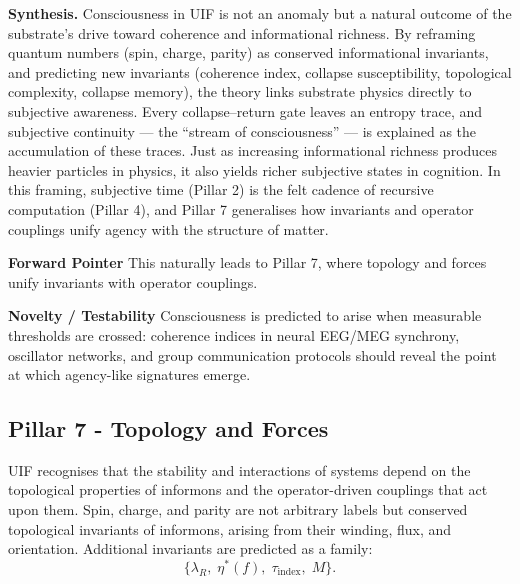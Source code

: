 \noindent \textbf{Synthesis.}
\newline Consciousness in UIF is not an anomaly but a natural outcome of the substrate’s drive toward coherence and informational richness. By reframing quantum numbers (spin, charge, parity) as conserved informational invariants, and predicting new invariants (coherence index, collapse susceptibility, topological complexity, collapse memory), the theory links substrate physics directly to subjective awareness. Every collapse–return gate leaves an entropy trace, and subjective continuity — the “stream of consciousness” — is explained as the accumulation of these traces. Just as increasing informational richness produces heavier particles in physics, it also yields richer subjective states in cognition. In this framing, subjective time (Pillar 2) is the felt cadence of recursive computation (Pillar 4), and Pillar 7 generalises how invariants and operator couplings unify agency with the structure of matter.
\newline

\noindent
\textbf{Forward Pointer} 
\newline This naturally leads to Pillar 7, where topology and forces unify invariants with operator couplings.
\newline

\noindent
\textbf{Novelty / Testability} 
\newline Consciousness is predicted to arise when measurable thresholds are crossed: coherence indices in neural EEG/MEG synchrony, oscillator networks, and group communication protocols should reveal the point at which agency-like signatures emerge.

\subsection {Pillar 7 - Topology and Forces}

UIF recognises that the stability and interactions of systems depend on the topological properties of informons and the operator-driven couplings that act upon them. Spin, charge, and parity are not arbitrary labels but conserved topological invariants of informons, arising from their winding, flux, and orientation. Additional invariants are predicted as a family:
\[
\{\lambda_R,\; \eta^{*}(f),\; \tau_{\text{index}},\; M\}.
\]

